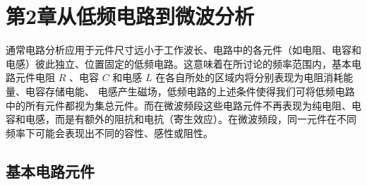 \section{第2章\quad 从低频电路到微波分析}
\begin{frame}
    通常电路分析应用于元件尺寸远小于工作波长、电路中的各元件（如电阻、电容和电感）彼此独立、位置固定的低频电路。这意味着在所讨论的频率范围内，基本电路元件电阻 $R$ 、电容 $C$ 和电感 $L$ 在各自所处的区域内将分别表现为电阻消耗能量、电容存储电能、
    电感产生磁场，低频电路的上述条件使得我们可将低频电路中的所有元件都视为集总元件。而在微波频段这些电路元件不再表现为纯电阻、电容和电感，而是有额外的阻抗和电抗（寄生效应）。在微波频段，同一元件在不同频率下可能会表现出不同的容性、感性或阻性。
\end{frame}

\subsection{基本电路元件}
